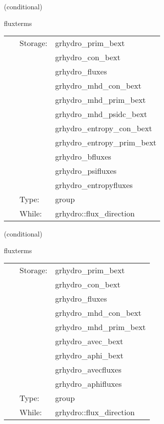 \vspace{5mm}

   (conditional) 

\hspace{5mm} fluxterms 

\hspace{5mm}{\it calculation of intercell fluxes } 


\hspace{5mm}

 \begin{tabular*}{160mm}{cll} 
~ & Storage:  & grhydro\_prim\_bext \\ 
~& ~ &grhydro\_con\_bext\\ 
~& ~ &grhydro\_fluxes\\ 
~& ~ &grhydro\_mhd\_con\_bext\\ 
~& ~ &grhydro\_mhd\_prim\_bext\\ 
~& ~ &grhydro\_mhd\_psidc\_bext\\ 
~& ~ &grhydro\_entropy\_con\_bext\\ 
~& ~ &grhydro\_entropy\_prim\_bext\\ 
~& ~ &grhydro\_bfluxes\\ 
~& ~ &grhydro\_psifluxes\\ 
~& ~ &grhydro\_entropyfluxes\\ 
~ & Type:  & group \\ 
~ & While:  & grhydro::flux\_direction \\ 
\end{tabular*} 


\vspace{5mm}

   (conditional) 

\hspace{5mm} fluxterms 

\hspace{5mm}{\it calculation of intercell fluxes } 


\hspace{5mm}

 \begin{tabular*}{160mm}{cll} 
~ & Storage:  & grhydro\_prim\_bext \\ 
~& ~ &grhydro\_con\_bext\\ 
~& ~ &grhydro\_fluxes\\ 
~& ~ &grhydro\_mhd\_con\_bext\\ 
~& ~ &grhydro\_mhd\_prim\_bext\\ 
~& ~ &grhydro\_avec\_bext\\ 
~& ~ &grhydro\_aphi\_bext\\ 
~& ~ &grhydro\_avecfluxes\\ 
~& ~ &grhydro\_aphifluxes\\ 
~ & Type:  & group \\ 
~ & While:  & grhydro::flux\_direction \\ 
\end{tabular*} 


